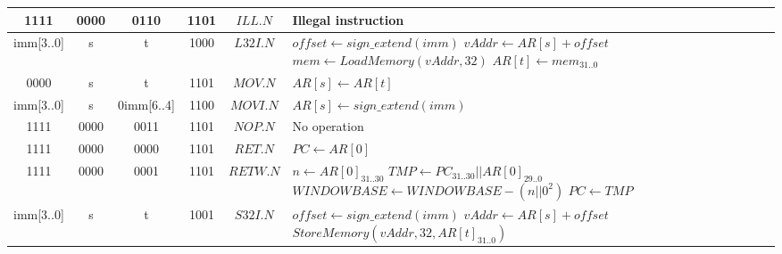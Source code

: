 \begin{longtable}{llllllllllllllll  p{1cm}  p{7cm} | }
		\multicolumn{4}{|c|}{1111} & \multicolumn{4}{c|}{0000} & \multicolumn{4}{c|}{0110} & \multicolumn{4}{c|}{1101} & \multicolumn{1}{c|}{$ILL.N$} & Illegal instruction\\ \hline
		\multicolumn{4}{|c|}{imm[3..0]} & \multicolumn{4}{c|}{s} & \multicolumn{4}{c|}{t} & \multicolumn{4}{c|}{1000} & \multicolumn{1}{c|}{$L32I.N$} & $offset \leftarrow sign\_extend(imm)$ \newline $vAddr \leftarrow AR[s] + offset$ \newline $mem \leftarrow LoadMemory(vAddr, 32)$ \newline $AR[t] \leftarrow mem_{31..0}$\\ \hline
		\multicolumn{4}{|c|}{0000} & \multicolumn{4}{c|}{s} & \multicolumn{4}{c|}{t} & \multicolumn{4}{c|}{1101} & \multicolumn{1}{c|}{$MOV.N$} &  $AR[s] \leftarrow AR[t]$ \\ \hline
		\multicolumn{4}{|c|}{imm[3..0]} & \multicolumn{4}{c|}{s} & \multicolumn{4}{c|}{0imm[6..4]} & \multicolumn{4}{c|}{1100} & \multicolumn{1}{c|}{$MOVI.N$} &  $AR[s] \leftarrow sign\_extend(imm)$ \\ \hline
		\multicolumn{4}{|c|}{1111} & \multicolumn{4}{c|}{0000} & \multicolumn{4}{c|}{0011} & \multicolumn{4}{c|}{1101} & \multicolumn{1}{c|}{$NOP.N$} & No operation \\ \hline
		\multicolumn{4}{|c|}{1111} & \multicolumn{4}{c|}{0000} & \multicolumn{4}{c|}{0000} & \multicolumn{4}{c|}{1101} & \multicolumn{1}{c|}{$RET.N$} & $PC \leftarrow AR[0]$ \\ \hline
		\multicolumn{4}{|c|}{1111} & \multicolumn{4}{c|}{0000} & \multicolumn{4}{c|}{0001} & \multicolumn{4}{c|}{1101} & \multicolumn{1}{c|}{$RETW.N$} &  $n \leftarrow AR[0]_{31..30}$ \newline $TMP \leftarrow PC_{31..30}||AR[0]_{29..0}$ \newline $WINDOWBASE \leftarrow WINDOWBASE - (n||0^2)$ \newline $PC \leftarrow TMP$ \\ \hline
		\multicolumn{4}{|c|}{imm[3..0]} & \multicolumn{4}{c|}{s} & \multicolumn{4}{c|}{t} & \multicolumn{4}{c|}{1001} & \multicolumn{1}{c|}{$S32I.N$} & $offset \leftarrow sign\_extend(imm)$ \newline $vAddr \leftarrow AR[s] + offset$ \newline $StoreMemory(vAddr, 32, AR[t]_{31..0})$\\ \hline
\end{longtable}

